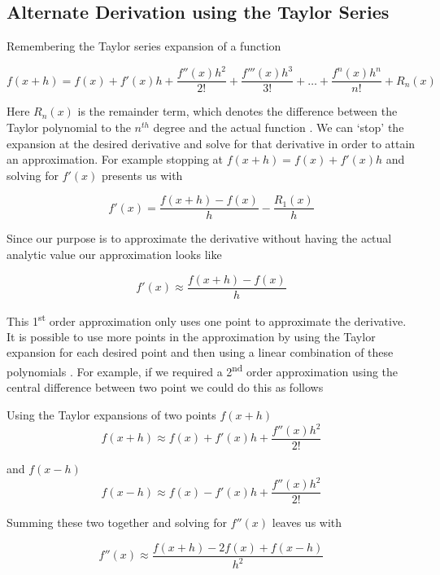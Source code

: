 \documentclass[authoryearcitations]{UoYCSproject}
\begin{document}
\subsection{Alternate Derivation using the Taylor Series}

Remembering the Taylor series expansion of a function

\begin{equation}
\label{eq:taylor}
f(x + h) = f(x) + f'(x)h+ \frac{f''(x)h^2}{2!} + \frac{f'''(x)h^3}{3!} + \dots + \frac{f^n(x)h^n}{n!} + R_{n}(x)
\end{equation}

Here $R_{n}(x)$ is the remainder term, which denotes the difference between the Taylor polynomial to the $n^{th}$ degree
and the actual function \cite{analysis}. 
We can `stop' the expansion at the desired derivative and solve for that derivative in order to attain an approximation. 
For example stopping at $f(x + h) = f(x) + f'(x)h$ and solving for $f'(x)$ presents us with

\begin{equation}
f'(x) = \frac{f(x + h) - f(x)}{h} - \frac{R_{1}(x)}{h}
\label{eq:taylorForward}
\end{equation}

Since our purpose is to approximate the derivative without having the actual analytic value our approximation looks like

\begin{equation}
f'(x) \approx \frac{f(x + h) - f(x)}{h}
\label{eq:taylorForwardApprox}
\end{equation}

This 1\textsuperscript{st} order approximation only uses one point to approximate the derivative. It is possible to use more 
points in the approximation by using the Taylor expansion for each desired point and then using a linear combination of these
polynomials \cite{farlow}. For example, if we required a 2\textsuperscript{nd} order approximation 
using the central difference between two point we could do this as follows

Using the Taylor expansions of two points $f(x+h)$
$$f(x+h) \approx f(x) + f'(x)h+ \frac{f''(x)h^2}{2!}$$ 

and $f(x-h)$
$$f(x-h) \approx f(x) - f'(x)h+ \frac{f''(x)h^2}{2!}$$ 

Summing these two together and solving for $f''(x)$ leaves us with

\begin{equation}
f''(x) \approx \frac{f(x + h) - 2f(x) + f(x - h)}{h^2}
\label{eq:2ndDegreeTaylor}
\end{equation}
\end{document}
